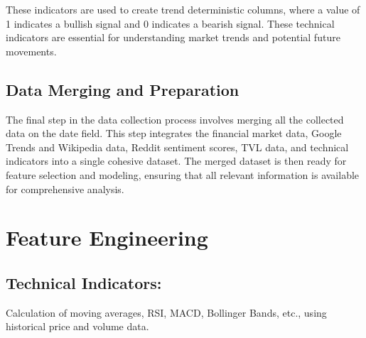 These indicators are used to create trend deterministic columns, where a value of 1 indicates a bullish signal and 0 indicates a bearish signal. 
These technical indicators are essential for understanding market trends and potential future movements.

\subsection{Data Merging and Preparation}
The final step in the data collection process involves merging all the collected data on the date field. This step integrates the financial market data, Google Trends and Wikipedia data,
 Reddit sentiment scores, TVL data, and technical indicators into a single cohesive dataset. The merged dataset is then ready for feature selection and modeling, ensuring that all relevant 
 information is available for comprehensive analysis.




\section{Feature Engineering}

\subsection{Technical Indicators:} Calculation of moving averages, RSI, MACD, Bollinger Bands, etc., using historical price and volume data.


